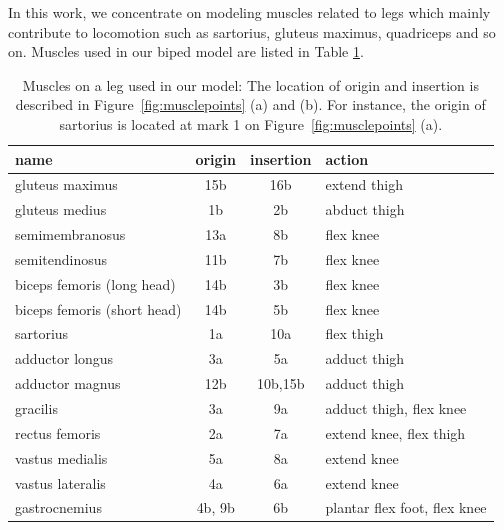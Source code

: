 \documentclass[master,english,final]{kaist-ucs}
\begin{document}
In this work, we concentrate on modeling muscles related to legs which mainly contribute to locomotion
such as sartorius, gluteus maximus, quadriceps and so on.
Muscles used in our biped model are listed in Table \ref{musclelist}.

\begin{table}[h!]
\centering
  \begin{tabular}{lccl}
  name                            &  origin       &insertion& action \\
  \hline
  gluteus maximus                 &  15b          & 16b     & extend thigh\\
  gluteus medius                  &  1b           & 2b      & abduct thigh\\
  semimembranosus                 &  13a          & 8b      & flex knee \\
  semitendinosus                  &  11b          & 7b      & flex knee \\
  biceps femoris (long head)      &  14b          & 3b      & flex knee \\
  biceps femoris (short head)     &  14b          & 5b      & flex knee \\
  sartorius                       &  1a           & 10a     & flex thigh \\
  adductor longus                 &  3a           & 5a      & adduct thigh \\
  adductor magnus                 &  12b          & 10b,15b & adduct thigh \\
  gracilis                        &  3a           & 9a      & adduct thigh, flex knee \\
  rectus femoris                  &  2a           & 7a      & extend knee, flex thigh \\
  vastus medialis                 &  5a           & 8a      & extend knee \\
  vastus lateralis                &  4a           & 6a      & extend knee\\
  gastrocnemius                   &  4b, 9b       & 6b      & plantar flex foot, flex knee\\
  \hline
\end{tabular}
\caption[Muscles on a leg used in our model]
{Muscles on a leg used in our model: The location of origin and insertion
is described in Figure~\ref{fig:musclepoints} (a) and (b). For instance, the origin of
sartorius is located at mark 1 on Figure~\ref{fig:musclepoints} (a).}
\label{musclelist}
\end{table}
\end{document}
